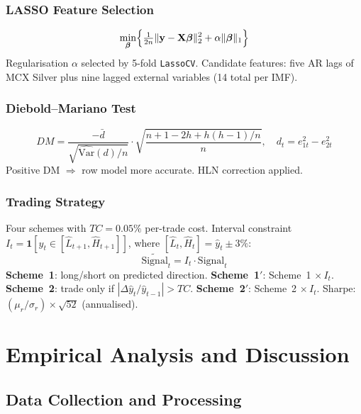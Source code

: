 \documentclass[12pt,a4paper]{article}
\begin{document}
\subsubsection{LASSO Feature Selection}

\begin{equation}
\min_{\bm{\beta}}\Bigl\{\tfrac{1}{2n}\|\mathbf{y}-\mathbf{X}\bm{\beta}\|_2^2
+\alpha\|\bm{\beta}\|_1\Bigr\}
\label{eq:lasso}
\end{equation}
Regularisation $\alpha$ selected by 5-fold \texttt{LassoCV}. Candidate features: five
AR lags of MCX Silver plus nine lagged external variables (14 total per IMF).

\subsubsection{Diebold--Mariano Test}

\begin{equation}
DM=\frac{-\bar{d}}{\sqrt{\widehat{\mathrm{Var}}(d)/n}}
\cdot\sqrt{\frac{n+1-2h+h(h-1)/n}{n}},\quad d_t=e_{1t}^2-e_{2t}^2
\label{eq:dm}
\end{equation}
Positive DM $\Rightarrow$ row model more accurate. HLN correction applied.

\subsubsection{Trading Strategy}

Four schemes with $TC=0.05\%$ per-trade cost. Interval constraint
$I_t=\mathbf{1}[y_t\in[\hat{L}_{t+1},\hat{H}_{t+1}]]$, where
$[\hat{L}_t,\hat{H}_t]=\hat{y}_t\pm3\%$:
\begin{equation}
\widetilde{\mathrm{Signal}}_t=I_t\cdot\mathrm{Signal}_t
\label{eq:constraint}
\end{equation}
\textbf{Scheme~1}: long/short on predicted direction.
\textbf{Scheme~1$'$}: Scheme~1 $\times\,I_t$.
\textbf{Scheme~2}: trade only if $|\Delta\hat{y}_t/\hat{y}_{t-1}|>TC$.
\textbf{Scheme~2$'$}: Scheme~2 $\times\,I_t$.
Sharpe: $(\mu_r/\sigma_r)\times\sqrt{52}$ (annualised).

\section{Empirical Analysis and Discussion}

\subsection{Data Collection and Processing}
\end{document}
